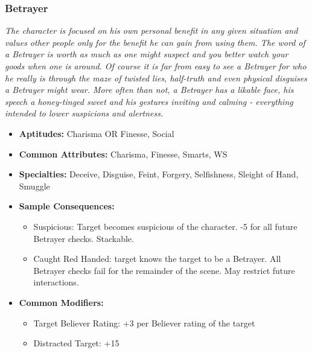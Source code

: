 \subsubsection{Betrayer}\label{Betrayer}
\textit{The character is focused on his own personal benefit in any given situation and values other people only for the benefit he can gain from using them.
The word of a Betrayer is worth as much as one might suspect and you better watch your goods when one is around.
Of course it is far from easy to see a Betrayer for who he really is through the maze of twisted lies, half-truth and even physical disguises a Betrayer might wear.
More often than not, a Betrayer has a likable face, his speech a honey-tinged sweet and his gestures inviting and calming - everything intended to lower suspicions and alertness.}
\begin{itemize}
	\item \textbf{Aptitudes:} Charisma OR Finesse, Social
	\item \textbf{Common Attributes:}  Charisma, Finesse, Smarts, WS
	\item \textbf{Specialties:} Deceive, Disguise, Feint, Forgery, Selfishness, Sleight of Hand, Smuggle
	\item \textbf{Sample Consequences:} 
	\begin{itemize}
		\item Suspicious: Target becomes suspicious of the character. -5 for all future Betrayer checks. Stackable.
		\item Caught Red Handed: target knows the target to be a Betrayer. All Betrayer checks fail for the remainder of the scene. May restrict future interactions.
	\end{itemize}
	\item \textbf{Common Modifiers:}
	\begin{itemize}
		\item Target Believer Rating: +3 per Believer rating of the target
		\item Distracted Target: +15
	\end{itemize}
\end{itemize}

